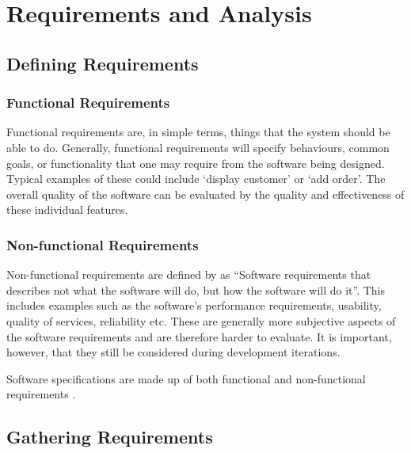\chapter{Requirements and Analysis}
\label{chap:methodology}

\section{Defining Requirements}
\subsection{Functional Requirements}
Functional requirements are, in simple terms, things that the system should be able to do. 
Generally, functional requirements will specify behaviours, common goals, or functionality that one may require from the software being designed.
Typical examples of these could include `display customer' or `add order'. 
The overall quality of the software can be evaluated by the quality and effectiveness of these individual features.

\subsection{Non-functional Requirements}
Non-functional requirements are defined by \cite[p.6]{chung2012non} as ``Software requirements that describes not what the software will do, but how the software will do it''.
This includes examples such as the software's performance requirements, usability, quality of services, reliability etc.
These are generally more subjective aspects of the software requirements and are therefore harder to evaluate. 
It is important, however, that they still be considered during development iterations.

Software specifications are made up of both functional and non-functional requirements \cite[p.143]{chung2012non}. 

\section{Gathering Requirements}
